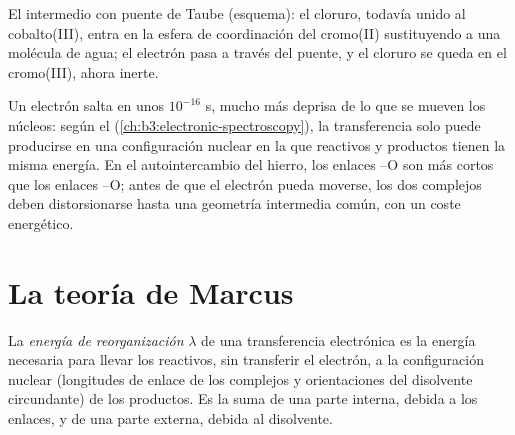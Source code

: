 \begin{omfigure}

{\small El intermedio con puente de Taube (esquema): el cloruro, todavía unido al
cobalto(III), entra en la esfera de coordinación del cromo(II) sustituyendo a una molécula de
agua; el electrón pasa a través del puente, y el cloruro se queda en el
cromo(III), ahora inerte.}
\end{omfigure}

Un electrón salta en unos $10^{-16}$ s, mucho más deprisa de lo que se mueven los núcleos: según el
 (\cref{ch:b3:electronic-spectroscopy}), la transferencia
solo puede producirse en una configuración nuclear en la que reactivos y productos tienen
la misma energía. En el autointercambio del hierro, los enlaces --O son más cortos que
los enlaces --O; antes de que el electrón pueda moverse, los dos complejos deben distorsionarse hasta
una geometría intermedia común, con un coste energético.

\section{La teoría de Marcus}

\begin{definition}\label{def:b3:complex-mechanisms:reorganisation}
La \emph{energía de reorganización} $\lambda$ de una
transferencia electrónica es la energía necesaria para llevar los reactivos, sin
transferir el electrón, a la configuración nuclear (longitudes de enlace de los
complejos y orientaciones del disolvente circundante) de los productos. Es la
suma de una parte interna, debida a los enlaces, y de una parte externa, debida al disolvente.
\end{definition}

